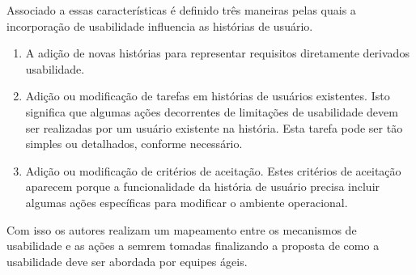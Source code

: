 \documentclass[12pt]{article}
\begin{document}
Associado a essas características é definido três maneiras pelas quais a incorporação de usabilidade influencia as histórias de usuário.
\begin{enumerate}
\item A adição de novas histórias para representar requisitos diretamente derivados usabilidade.
\item Adição ou modificação de tarefas em histórias de usuários existentes. Isto significa que algumas ações decorrentes de limitações de usabilidade devem ser realizadas por um usuário existente na história. Esta tarefa pode ser tão simples ou detalhados, conforme necessário.
\item Adição ou modificação de critérios de aceitação. Estes critérios de aceitação aparecem porque a funcionalidade da história de usuário precisa incluir algumas ações específicas para modificar o ambiente operacional.
\end{enumerate}

Com isso os autores realizam um mapeamento entre os mecanismos de usabilidade e as ações a semrem tomadas finalizando a proposta de como a usabilidade deve ser abordada por equipes ágeis.
\end{document}
